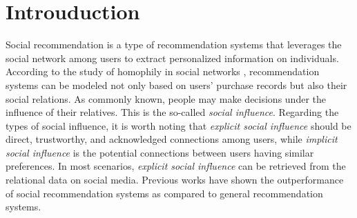 \documentclass[letterpaper]{article} %
\begin{document}
\section{Introuduction}
Social recommendation is a type of recommendation systems that leverages the social network among users to extract personalized information on individuals. According to the study of homophily in social networks \cite{birds_of_feather, dual_graph}, recommendation systems can be modeled not only based on users' purchase records but also their social relations. As commonly known, people may make decisions under the influence of their relatives. This is the so-called \textit{social influence}. Regarding the types of social influence, it is worth noting that \textit{explicit social influence} should be direct, trustworthy, and acknowledged connections among users, while \textit{implicit social influence} is the potential connections between users having similar preferences. In most scenarios, \textit{explicit social influence} can be retrieved from the relational data on social media. Previous works \cite{sorec, socialmf, trustsvd} have shown the outperformance of social recommendation systems as compared to general recommendation systems.
\end{document}
